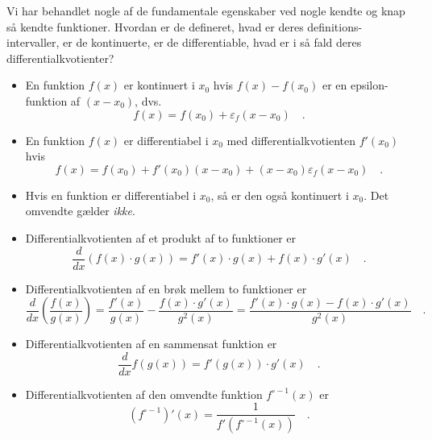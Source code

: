 \begin{summary}
Vi har behandlet nogle af de fundamentale egenskaber ved nogle kendte og knap så kendte
funktioner. Hvordan er de defineret, hvad er deres definitions-intervaller, er de kontinuerte, er de differentiable, hvad
er i så fald deres differentialkvotienter?

\begin{itemize}
\item En funktion  $f(x)$ er kontinuert i $x_{0}$ hvis $f(x) - f(x_{0})$ er en epsilon-funktion af $(x - x_{0})$, dvs.
\begin{equation}
f(x) = f(x_{0}) + \varepsilon_{f}(x - x_{0}) \quad.
\end{equation}
\item En funktion $f(x)$ er differentiabel i $x_{0}$ med differentialkvotienten $f'(x_{0})$ hvis
\begin{equation*}
f(x) = f(x_{0}) + f'(x_{0})(x-x_{0}) + (x-x_{0})\varepsilon_{f}(x-x_{0})\quad .
\end{equation*}
\item Hvis en funktion er differentiabel i $x_{0}$, så er den også kontinuert i $x_{0}$. Det omvendte gælder \emph{ikke}.
\item Differentialkvotienten af et produkt af to funktioner er
\begin{equation}
\frac{d}{dx}\left(f(x)\cdot g(x)\right) = f'(x)\cdot g(x) + f(x)\cdot g'(x) \quad .
\end{equation}
\item Differentialkvotienten af en brøk mellem to funktioner er
\begin{equation}
\frac{d}{dx}\left( \frac{f(x)}{g(x)}\right) = \frac{f'(x)}{g(x)} - \frac{f(x) \cdot g'(x)}{g^{2}(x)}= \frac{f'(x)\cdot g(x) - f(x)\cdot g'(x)}{g^{2}(x)} \quad .
\end{equation}
\item Differentialkvotienten af en sammensat funktion er
\begin{equation}
\frac{d}{dx} f(g(x)) = f'(g(x))\cdot g'(x) \quad .
\end{equation}

\item Differentialkvotienten af den omvendte funktion $f^{\circ-1}(x)$  er
\begin{equation}
\left(f^{\circ-1}\right)'(x) = \frac{1}{f'(f^{\circ-1}(x))} \quad .
\end{equation}
\end{itemize}



\end{summary}











